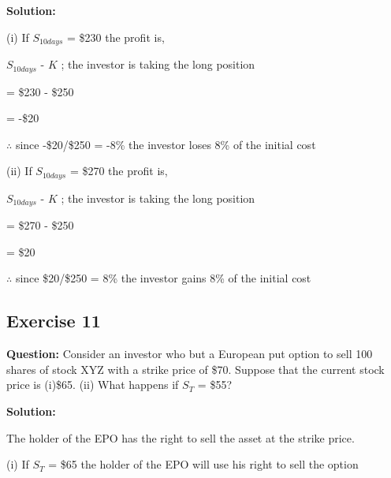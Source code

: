 \documentclass{article}
\begin{document}
\vspace{\baselineskip}

\textbf{Solution:}

(i)
If $S_{10 days}$ = \$230 the profit is,

\vspace{\baselineskip}

$S_{10days}$ - $K$ ; the investor is taking the long position

\vspace{\baselineskip}

= \$230 - \$250 

\vspace{\baselineskip}

= -\$20

$\therefore$ since -\$20/\$250 = -8\% the investor loses 8\% of the initial cost

\vspace{\baselineskip}

(ii)
If $S_{10 days}$ = \$270 the profit is,

\vspace{\baselineskip}

$S_{10days}$ - $K$ ; the investor is taking the long position

\vspace{\baselineskip}

= \$270 - \$250 

\vspace{\baselineskip}

= \$20

$\therefore$ since \$20/\$250 = 8\% the investor gains 8\% of the initial cost

\subsection*{Exercise 11}

\textbf{Question:} Consider an investor who but a European put option to sell 100 shares of stock XYZ with a strike price of \$70. Suppose that the current stock price is (i)\$65. (ii) What happens if $S_T$ = \$55?

\textbf{Solution:}

The holder of the EPO has the right to sell the asset at the strike price.

\vspace{\baselineskip}

(i) If $S_T$ = \$65 the holder of the EPO will use his right to sell the option 
\end{document}
